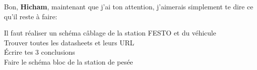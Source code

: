 \documentclass[10pt,a4paper,final]{article}
\begin{document}
\begin{spacing}{1.5}
\pagebreak
\begin{center}
\end{center}

\begin{flushleft}
\begin{large}
Bon, \textbf{Hicham}, maintenant que j'ai ton attention, j'aimerais simplement te dire ce qu'il reste à faire:\\

\bigskip

Il faut réaliser un schéma câblage de la station FESTO et du véhicule\\
Trouver toutes les datasheets et leurs URL\\
Écrire tes 3 conclusions\\
Faire le schéma bloc de la station de pesée\\
\end{large}
\end{flushleft}

\pagebreak


\end{spacing}
\end{document}
